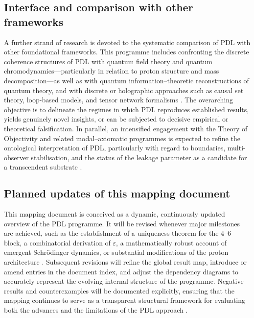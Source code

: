 \documentclass{article}
\begin{document}
\subsection{Interface and comparison with other frameworks}
\label{subsec:roadmap_interface}

A further strand of research is devoted to the systematic comparison of PDL with other foundational frameworks. This programme includes confronting the discrete coherence structures of PDL with quantum field theory and quantum chromodynamics—particularly in relation to proton structure and mass decomposition—as well as with quantum information–theoretic reconstructions of quantum theory, and with discrete or holographic approaches such as causal set theory, loop-based models, and tensor network formalisms \cite{PDL_intro,PDL_position}. The overarching objective is to delineate the regimes in which PDL reproduces established results, yields genuinely novel insights, or can be subjected to decisive empirical or theoretical falsification. In parallel, an intensified engagement with the Theory of Objectivity and related modal–axiomatic programmes is expected to refine the ontological interpretation of PDL, particularly with regard to boundaries, multi-observer stabilisation, and the status of the leakage parameter as a candidate for a transcendent substrate \cite{PDL_TO_dialogue,PDL_position}.

\subsection{Planned updates of this mapping document}
\label{subsec:roadmap_mapping}

This mapping document is conceived as a dynamic, continuously updated overview of the PDL programme. It will be revised whenever major milestones are achieved, such as the establishment of a uniqueness theorem for the $4$--$6$ block, a combinatorial derivation of $\varepsilon$, a mathematically robust account of emergent Schr\"odinger dynamics, or substantial modifications of the proton architecture \cite{PDL_position}. Subsequent revisions will refine the global result map, introduce or amend entries in the document index, and adjust the dependency diagrams to accurately represent the evolving internal structure of the programme. Negative results and counterexamples will be documented explicitly, ensuring that the mapping continues to serve as a transparent structural framework for evaluating both the advances and the limitations of the PDL approach \cite{PDL_position}.
\end{document}
